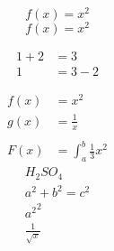 \documentclass{article}
\begin{document}
\begin{equation}
    f(x) = x ^ 2
    \end{equation}
\begin{equation*}
    f(x) = x ^ 2
    \end{equation*}

\begin{align}
    1 + 2 &= 3 \\
    1 &= 3 - 2
\end{align}

\begin{align}
    f(x) &= x ^ 2 \\
    g(x) &=  \frac{1}{x}\\\\
    F(x) &= \int_{a}^{b}\frac{1}{3 } x ^ 2
\end{align}
\begin{align*}
    H_{2}SO_{4}\\
a ^ {2} + b ^ {2} = c ^ {2}\\
{a ^ 2} ^ 2\\
\frac{1} {\sqrt{x}}\\
\end{align*}
\end{document}
